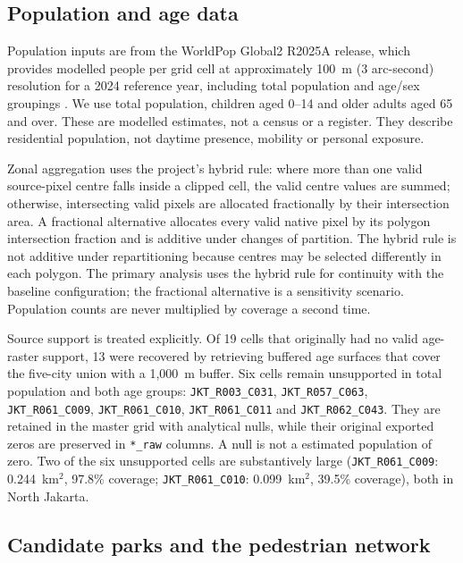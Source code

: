 \documentclass[times,twoside]{_Templates/MultiTargetManuscript}
\begin{document}
\subsection{Population and age data}

Population inputs are from the WorldPop Global2 R2025A release, which provides
modelled people per grid cell at approximately 100~m (3 arc-second) resolution
for a 2024 reference year, including total population and age/sex groupings
\citep{worldpop2025}. We use total population, children aged 0--14 and older
adults aged 65 and over. These are modelled estimates, not a census or a
register. They describe residential population, not daytime presence, mobility
or personal exposure.

Zonal aggregation uses the project's hybrid rule: where more than one valid
source-pixel centre falls inside a clipped cell, the valid centre values are
summed; otherwise, intersecting valid pixels are allocated fractionally by
their intersection area. A fractional alternative allocates every valid native
pixel by its polygon intersection fraction and is additive under changes of
partition. The hybrid rule is not additive under repartitioning because centres
may be selected differently in each polygon. The primary analysis uses the
hybrid rule for continuity with the baseline configuration; the fractional alternative
is a sensitivity scenario. Population counts are never multiplied by coverage a
second time.

Source support is treated explicitly. Of 19 cells that originally had no valid
age-raster support, 13 were recovered by retrieving buffered age surfaces that
cover the five-city union with a 1,000~m buffer. Six cells remain unsupported in
total population and both age groups:
\texttt{JKT\_R003\_C031}, \texttt{JKT\_R057\_C063},
\texttt{JKT\_R061\_C009}, \texttt{JKT\_R061\_C010},
\texttt{JKT\_R061\_C011} and \texttt{JKT\_R062\_C043}. They are retained in the
master grid with analytical nulls, while their original exported zeros are
preserved in \texttt{*\_raw} columns. A null is not a estimated population of
zero. Two of the six unsupported cells are substantively large
(\texttt{JKT\_R061\_C009}: 0.244~km$^2$, 97.8\% coverage;
\texttt{JKT\_R061\_C010}: 0.099~km$^2$, 39.5\% coverage), both in North Jakarta.

\subsection{Candidate parks and the pedestrian network}
\end{document}

